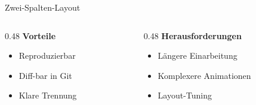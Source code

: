 \begin{frame}{Zwei-Spalten-Layout}
  \begin{columns}[T,onlytextwidth]
    \begin{column}{0.48\textwidth}
      \textbf{Vorteile}
      \begin{itemize}
        \item Reproduzierbar
        \item Diff-bar in Git
        \item Klare Trennung
      \end{itemize}
    \end{column}
    \begin{column}{0.48\textwidth}
      \textbf{Herausforderungen}
      \begin{itemize}
        \item Längere Einarbeitung
        \item Komplexere Animationen
        \item Layout-Tuning
      \end{itemize}
    \end{column}
  \end{columns}
\end{frame}